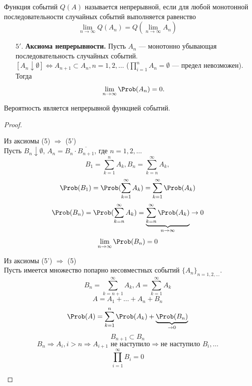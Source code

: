 \begin{definition}
	Функция событий $Q(A)$ называется непрерывной, если для любой монотонной последовательности случайных событий выполняется равенство
	\[
		\lim\limits_{n \to \infty} Q(A_n) = Q(\lim\limits_{n \to \infty} A_n)
	\]
\end{definition}
\begin{enumerate}
	\setcounter{enumi}{4}
	\item[$5'.$] \textbf{Аксиома непрерывности.} Пусть $A_n$ --- монотонно убывающая последовательность случайных событий. \\ $[A_n \downarrow \emptyset] \Leftrightarrow A_{n+1} \subset A_n, n = 1, 2, \dots$ ($\prod\limits_{i=1}^n A_n = \emptyset$ --- предел невозможен). Тогда
	      \[
		      \lim\limits_{n \to \infty} \Prob(A_n) = 0.
	      \]
\end{enumerate}

\begin{theorem}
	Вероятность является непрерывной функцией событий.
\end{theorem}
\begin{proof}
	\begin{description}[leftmargin = 0cm]
		\item Из аксиомы (5) $\Rightarrow$ (5') \\
		      Пусть $B_n \downarrow \emptyset$, $A_n = B_n \cdot \overline{B_{n+1}}$, где $n = 1,2, \dots$ \\
		      \[
			      B_1 = \sum\limits_{k=1}^n A_k, B_n = \sum\limits_{k=n}^\infty A_k,
		      \]
		      \[
			      \Prob(B_1) = \Prob(\sum\limits_{k=1}^\infty A_k) = \sum\limits_{k=1}^\infty \Prob(A_k)
		      \]
		      \[ \Prob(B_n) = \Prob(\sum\limits_{k=n}^\infty A_k) = \underbrace{\sum\limits_{k=n}^\infty \Prob(A_k)}_{n \to \infty} \to 0 \]
		      \[ \lim\limits_{n \to \infty} \Prob (B_n) = 0\]
		\item Из аксиомы (5') $\Rightarrow$ (5) \\
		      Пусть имеется множество попарно несовместных событий ${\{A_n\}}_{n = 1, 2, \dots}$.
		      \[ B_n = \sum\limits_{k=n+1}^\infty A_k, A = \sum\limits_{k=1}^\infty A_k \]
		      \[ A = A_1 + \ldots + A_n + B_n \]
		      \[ \Prob(A) = \sum\limits_{k=1}^n \Prob(A_k) + \underbrace{\Prob(B_n)}_{\to 0} \]
		      \[ B_{n+1} \subset B_n \]
		      \[ B_n \Rightarrow A_i, i > n \Rightarrow A_{i+1} \text{ не наступило} \Rightarrow \text{не наступило } B_i, \dots \]
		      \[ \prod\limits_{i=1}^\infty B_i = 0 \]
	\end{description}
\end{proof}
